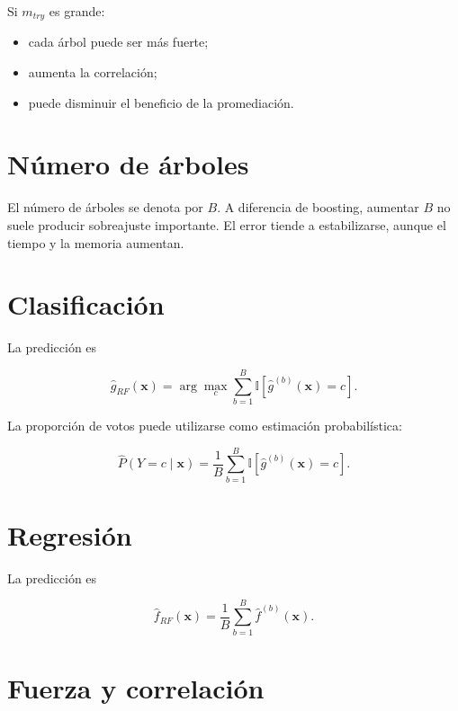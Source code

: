 \documentclass[
  spanish,
  10.5pt,
  letterpaper,
  DIV=11,
  numbers=noendperiod,
  oneside,
  open=any]{scrreprt}
\providecommand{\tightlist}{%
  \setlength{\itemsep}{0pt}\setlength{\parskip}{0pt}}
\theoremstyle{definition}
\theoremstyle{definition}
\theoremstyle{plain}
\theoremstyle{remark}
\begin{document}
Si \(m_{try}\) es grande:

\begin{itemize}
\tightlist
\item
  cada árbol puede ser más fuerte;
\item
  aumenta la correlación;
\item
  puede disminuir el beneficio de la promediación.
\end{itemize}

\section*{Número de árboles}\label{nuxfamero-de-uxe1rboles}


El número de árboles se denota por \(B\). A diferencia de boosting,
aumentar \(B\) no suele producir sobreajuste importante. El error tiende
a estabilizarse, aunque el tiempo y la memoria aumentan.

\section*{Clasificación}\label{clasificaciuxf3n-1}


La predicción es

\[
\widehat{g}_{RF}(\mathbf{x})
=
\arg\max_c
\sum_{b=1}^{B}
\mathbb{I}
\left[
\widehat{g}^{(b)}(\mathbf{x})=c
\right].
\]

La proporción de votos puede utilizarse como estimación probabilística:

\[
\widehat{P}(Y=c\mid\mathbf{x})
=
\frac{1}{B}
\sum_{b=1}^{B}
\mathbb{I}
\left[
\widehat{g}^{(b)}(\mathbf{x})=c
\right].
\]

\section*{Regresión}\label{regresiuxf3n-1}


La predicción es

\[
\widehat{f}_{RF}(\mathbf{x})
=
\frac{1}{B}
\sum_{b=1}^{B}
\widehat{f}^{(b)}(\mathbf{x}).
\]

\section*{Fuerza y correlación}\label{fuerza-y-correlaciuxf3n}
\end{document}
